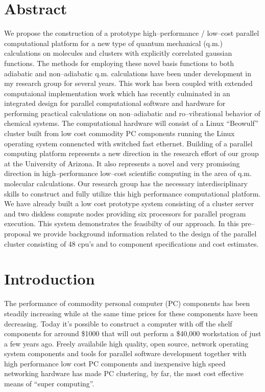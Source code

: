 \section{Abstract}
We propose the construction of a prototype high--performance /
low--cost parallel computational platform for a new type of quantum
mechanical (q.m.) calculations on molecules and clusters with
explicitly correlated gaussian functions.  The methods for employing
these novel basis functions to both adiabatic and non--adiabatic q.m.
calculations have been under development in my research group for
several years. This work has been coupled with extended computaional
implementation work which has recently culminated in an integrated
design for parallel computational software and hardware for performing
practical calculations on non--adiabatic and ro--vibrational behavior
of chemical systems.  The computational hardware will consist of a
Linux ``Beowulf'' cluster built from low cost commodity PC components
running the Linux operating system connencted with switched fast
ethernet.  Building of a parallel computing platform represents a new
direction in the research effort of our group at the University of
Arizona.  It also represents a novel and very promissing direction in
high--performance low--cost scientific computing in the area of q.m.
molecular calculations.  Our research group has the necessary
interdisciplinary skills to construct and fully utilize this high
performance computational platform.  We have already built a low cost
prototype system consisting of a cluster server and two diskless
compute nodes providing six processors for parallel program execution.
This system demonstrates the feasibilty of our approach.  In this
pre--proposal we provide background information related to the design
of the parallel cluster consisting of 48 cpu's and to component
specifications and cost estimates.

\newpage


\section{Introduction}

The performance of commodity personal computer (PC) components has
been steadily increasing while at the same time prices for these
components have been decreasing. Today it's possible to construct a
computer with off the shelf components for arround \$1000 that will
out perform a \$40,000 workstation of just a few years ago. Freely
availabile high quality, open source, network operating system
components and tools for parallel software development together with
high performance low cost PC components and inexpensive high speed
networking hardware has made PC clustering, by far, the most cost
effective means of ``super computing''.

